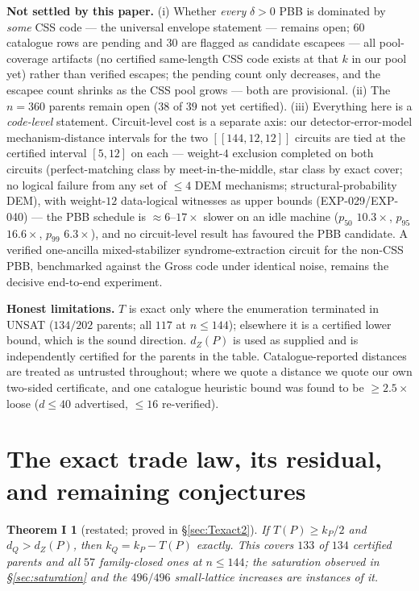 \documentclass[11pt]{article}
\newcommand{\nk}[1]{[\![#1]\!]}
\theoremstyle{plain}
\newtheorem*{theoremI}{Theorem I}
\theoremstyle{remark}
\begin{document}
\textbf{Not settled by this paper.} (i) Whether \emph{every} $\delta>0$ PBB is dominated by \emph{some}
CSS code --- the universal envelope statement --- remains open; $60$ catalogue rows are
pending and $30$ are flagged as candidate escapees --- all pool-coverage artifacts
(no certified same-length CSS code exists at that $k$ in our pool yet) rather than
verified escapes; the pending count only decreases, and the escapee count shrinks as the CSS pool grows --- both are provisional. (ii) The $n=360$ parents remain open ($38$ of $39$ not yet certified). (iii) Everything here is
a \emph{code-level} statement. Circuit-level cost is a separate axis: our detector-error-model
mechanism-distance intervals for the two $\nk{144,12,12}$ circuits are tied at the certified interval $[5,12]$ on each --- weight-$4$ exclusion completed on both circuits (perfect-matching class by meet-in-the-middle, star class by exact cover; no logical failure from any set of $\le4$ DEM mechanisms; structural-probability DEM), with weight-$12$ data-logical witnesses as upper bounds (EXP-029/EXP-040) --- the PBB
schedule is $\approx 6$--$17\times$ slower on an idle machine ($p_{50}$ $10.3\times$,
$p_{95}$ $16.6\times$, $p_{99}$ $6.3\times$), and no circuit-level result has favoured the
PBB candidate. A verified one-ancilla mixed-stabilizer syndrome-extraction circuit for
the non-CSS PBB, benchmarked against the Gross code under identical noise, remains the
decisive end-to-end experiment.

\textbf{Honest limitations.} $T$ is exact only where the enumeration terminated in UNSAT
($134/202$ parents; all $117$ at $n\le 144$); elsewhere it is a certified lower bound, which is the sound
direction. $d_Z(P)$ is used as supplied and is independently certified for the parents
in the table. Catalogue-reported distances are treated as untrusted throughout; where we
quote a distance we quote our own two-sided certificate, and one catalogue heuristic
bound was found to be $\ge 2.5\times$ loose ($d\le 40$ advertised, $\le 16$ re-verified).

\section{The exact trade law, its residual, and remaining conjectures}\label{sec:conjectures}

\begin{theoremI}[restated; proved in \S\ref{sec:Texact2}]
If $T(P)\ge k_P/2$ and $d_Q>d_Z(P)$,
then $k_Q=k_P-T(P)$ exactly. This covers $133$ of $134$ certified parents and
all $57$ family-closed ones at $n\le 144$; the saturation observed in \S\ref{sec:saturation} and
the $496/496$ small-lattice increases are instances of it.
\end{theoremI}
\end{document}
